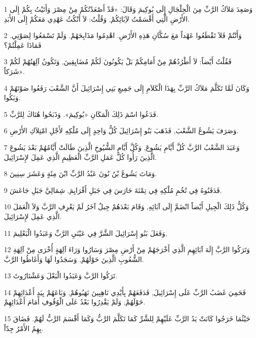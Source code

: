 \par 1 وَصَعِدَ مَلاَكُ الرَّبِّ مِنَ الْجِلْجَالِ إِلَى بُوكِيمَ وَقَالَ: «قَدْ أَصْعَدْتُكُمْ مِنْ مِصْرَ وَأَتَيْتُ بِكُمْ إِلَى الأَرْضِ الَّتِي أَقْسَمْتُ لآِبَائِكُمْ, وَقُلْتُ: لاَ أَنْكُثُ عَهْدِي مَعَكُمْ إِلَى الأَبَدِ.
\par 2 وَأَنْتُمْ فَلاَ تَقْطَعُوا عَهْداً مَعَ سُكَّانِ هَذِهِ الأَرْضِ. اهْدِمُوا مَذَابِحَهُمْ. وَلَمْ تَسْمَعُوا لِصَوْتِي. فَمَاذَا عَمِلْتُمْ؟
\par 3 فَقُلْتُ أَيْضاً: لاَ أَطْرُدُهُمْ مِنْ أَمَامِكُمْ بَلْ يَكُونُونَ لَكُمْ مُضَايِقِينَ, وَتَكُونُ آلِهَتُهُمْ لَكُمْ شَرَكاً».
\par 4 وَكَانَ لَمَّا تَكَلَّمَ مَلاَكُ الرَّبِّ بِهَذَا الْكَلاَمِ إِلَى جَمِيعِ بَنِي إِسْرَائِيلَ أَنَّ الشَّعْبَ رَفَعُوا صَوْتَهُمْ وَبَكُوا.
\par 5 فَدَعُوا اسْمَ ذَلِكَ الْمَكَانِ «بُوكِيمَ». وَذَبَحُوا هُنَاكَ لِلرَّبِّ.
\par 6 وَصَرَفَ يَشُوعُ الشَّعْبَ, فَذَهَبَ بَنُو إِسْرَائِيلَ كُلُّ وَاحِدٍ إِلَى مُلْكِهِ لأَجْلِ امْتِلاَكِ الأَرْضِ.
\par 7 وَعَبَدَ الشَّعْبُ الرَّبَّ كُلَّ أَيَّامِ يَشُوعَ, وَكُلَّ أَيَّامِ الشُّيُوخِ الَّذِينَ طَالَتْ أَيَّامُهُمْ بَعْدَ يَشُوعَ الَّذِينَ رَأُوا كُلَّ عَمَلِ الرَّبِّ الْعَظِيمِ الَّذِي عَمِلَ لإِسْرَائِيلَ.
\par 8 وَمَاتَ يَشُوعُ بْنُ نُونَ عَبْدُ الرَّبِّ ابْنَ مِئَةٍ وَعَشَرَ سِنِينَ.
\par 9 فَدَفَنُوهُ فِي تُخُمِ مُلْكِهِ فِي تِمْنَةَ حَارَسَ فِي جَبَلِ أَفْرَايِمَ, شِمَالِيَّ جَبَلِ جَاعَشَ.
\par 10 وَكُلُّ ذَلِكَ الْجِيلِ أَيْضاً انْضَمَّ إِلَى آبَائِهِ, وَقَامَ بَعْدَهُمْ جِيلٌ آخَرُ لَمْ يَعْرِفِ الرَّبَّ وَلاَ الْعَمَلَ الَّذِي عَمِلَ لإِسْرَائِيلَ.
\par 11 وَفَعَلَ بَنُو إِسْرَائِيلَ الشَّرَّ فِي عَيْنَيِ الرَّبِّ وَعَبَدُوا الْبَعْلِيمَ,
\par 12 وَتَرَكُوا الرَّبَّ إِلَهَ آبَائِهِمِ الَّذِي أَخْرَجَهُمْ مِنْ أَرْضِ مِصْرَ وَسَارُوا وَرَاءَ آلِهَةٍ أُخْرَى مِنْ آلِهَةِ الشُّعُوبِ الَّذِينَ حَوْلَهُمْ, وَسَجَدُوا لَهَا وَأَغَاظُوا الرَّبَّ.
\par 13 تَرَكُوا الرَّبَّ وَعَبَدُوا الْبَعْلَ وَعَشْتَارُوثَ.
\par 14 فَحَمِيَ غَضَبُ الرَّبِّ عَلَى إِسْرَائِيلَ, فَدَفَعَهُمْ بِأَيْدِي نَاهِبِينَ نَهَبُوهُمْ, وَبَاعَهُمْ بِيَدِ أَعْدَائِهِمْ حَوْلَهُمْ, وَلَمْ يَقْدِرُوا بَعْدُ عَلَى الْوُقُوفِ أَمَامَ أَعْدَائِهِمْ.
\par 15 حَيْثُمَا خَرَجُوا كَانَتْ يَدُ الرَّبِّ عَلَيْهِمْ لِلشَّرِّ كَمَا تَكَلَّمَ الرَّبُّ وَكَمَا أَقْسَمَ الرَّبُّ لَهُمْ. فَضَاقَ بِهِمُ الأَمْرُ جِدّاً.
